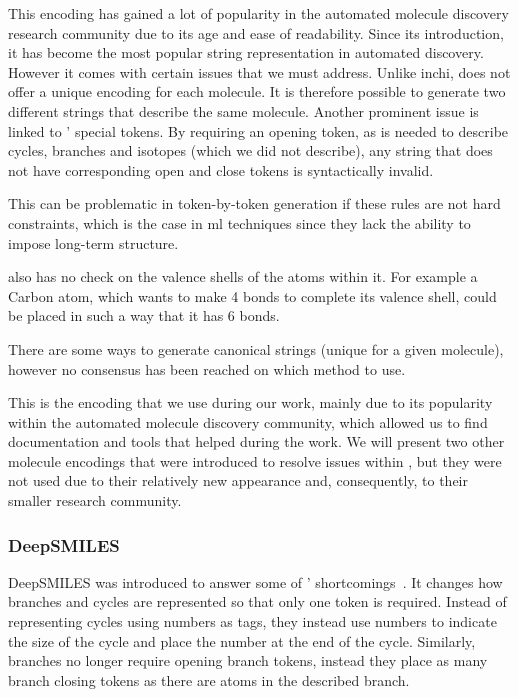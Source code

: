 \documentclass[../Document.tex]{subfiles}
\begin{document}
This encoding has gained a lot of popularity in the automated molecule discovery research community due to its age and ease of readability. Since its introduction, it has become the most popular string representation in automated discovery.
However it comes with certain issues that we must address. Unlike \gls{inchi}, \smiles does not offer a unique encoding for each molecule. It is therefore possible to generate two different strings that describe the same molecule.
Another prominent issue is linked to \smiles' special tokens. By requiring an opening token, as is needed to describe cycles, branches and isotopes (which we did not describe), any string that does not have corresponding open and close tokens is syntactically invalid. 

This can be problematic in token-by-token generation if these rules are not hard constraints, which is the case in \gls{ml} techniques since they lack the ability to impose long-term structure.

\smiles also has no check on the valence shells of the atoms within it. 
For example a Carbon atom, which wants to make 4 bonds to complete its valence shell, could be placed in such a way that it has 6 bonds.

There are some ways to generate canonical \smiles strings (\ie unique for a given molecule), however no consensus has been reached on which method to use.

This is the encoding that we use during our work, mainly due to its popularity within the automated molecule discovery community, which allowed us to find documentation and tools that helped during the work. We will present two other molecule encodings that were introduced to resolve issues within \smiles, but they were not used due to their relatively new appearance and, consequently, to their smaller research community.


\subsubsection{DeepSMILES}
DeepSMILES was introduced to answer some of \smiles' shortcomings~\cite{deepsmiles_intro}. It changes how branches and cycles are represented so that only one token is required. Instead of representing cycles using numbers as tags, they instead use numbers to indicate the size of the cycle and place the number at the end of the cycle. Similarly, branches no longer require opening branch tokens, instead they place as many branch closing tokens as there are atoms in the described branch.
\end{document}
